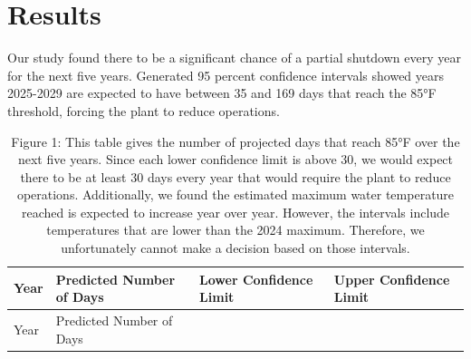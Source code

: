 \documentclass[
  letterpaper,
  DIV=11,
  numbers=noendperiod]{scrreprt}
\begin{document}
\section*{Results}\label{results}


Our study found there to be a significant chance of a partial shutdown
every year for the next five years. Generated 95 percent confidence
intervals showed years 2025-2029 are expected to have between 35 and 169
days that reach the 85°F threshold, forcing the plant to reduce
operations.

\begin{longtable}[]{@{}
  >{\raggedright\arraybackslash}p{}
  >{\raggedright\arraybackslash}p{}
  >{\raggedright\arraybackslash}p{}
  >{\raggedright\arraybackslash}p{}@{}}
\caption{Figure 1: This table gives the number of projected days that
reach 85°F over the next five years. Since each lower confidence limit
is above 30, we would expect there to be at least 30 days every year
that would require the plant to reduce operations. Additionally, we
found the estimated maximum water temperature reached is expected to
increase year over year. However, the intervals include temperatures
that are lower than the 2024 maximum. Therefore, we unfortunately cannot
make a decision based on those intervals.}\tabularnewline
\toprule\noalign{}
\begin{minipage}[b]{\linewidth}\raggedright
Year
\end{minipage} & \begin{minipage}[b]{\linewidth}\raggedright
Predicted Number of Days
\end{minipage} & \begin{minipage}[b]{\linewidth}\raggedright
Lower Confidence Limit
\end{minipage} & \begin{minipage}[b]{\linewidth}\raggedright
Upper Confidence Limit
\end{minipage} \\
\midrule\noalign{}
\endfirsthead
\toprule\noalign{}
\begin{minipage}[b]{\linewidth}\raggedright
Year
\end{minipage} & \begin{minipage}[b]{\linewidth}\raggedright
Predicted Number of Days
\end{minipage} & \begin{minipage}[b]{\linewidth}\raggedright

\end{minipage}
\end{longtable}
\end{document}
